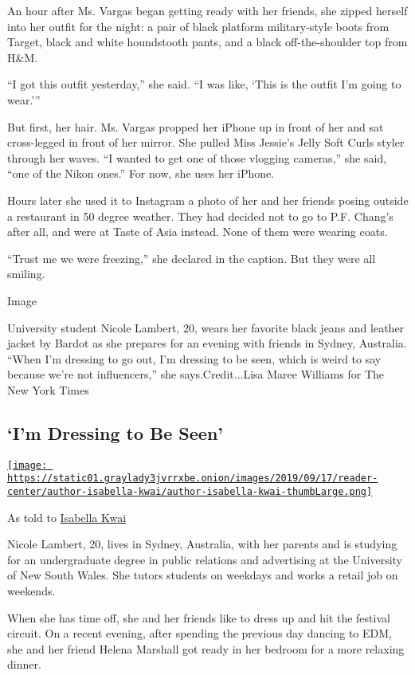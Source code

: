 An hour after Ms. Vargas began getting ready with her friends, she
zipped herself into her outfit for the night: a pair of black platform
military-style boots from Target, black and white houndstooth pants, and
a black off-the-shoulder top from H\&M.

``I got this outfit yesterday,'' she said. ``I was like, `This is the
outfit I'm going to wear.'''

But first, her hair. Ms. Vargas propped her iPhone up in front of her
and sat cross-legged in front of her mirror. She pulled Miss Jessie's
Jelly Soft Curls styler through her waves. ``I wanted to get one of
those vlogging cameras,'' she said, ``one of the Nikon ones.'' For now,
she uses her iPhone.

Hours later she used it to Instagram a photo of her and her friends
posing outside a restaurant in 50 degree weather. They had decided not
to go to P.F. Chang's after all, and were at Taste of Asia instead. None
of them were wearing coats.

``Trust me we were freezing,'' she declared in the caption. But they
were all smiling.

Image

University student Nicole Lambert, 20, wears her favorite black jeans
and leather jacket by Bardot as she prepares for an evening with friends
in Sydney, Australia. ``When I'm dressing to go out, I'm dressing to be
seen, which is weird to say because we're not influencers,'' she
says.Credit...Lisa Maree Williams for The New York Times

\hypertarget{im-dressing-to-be-seen}{%
\subsection{`I'm Dressing to Be Seen'}\label{im-dressing-to-be-seen}}

\href{https://www.nytimes3xbfgragh.onion/by/isabella-kwai}{\texttt{[image: https://static01.graylady3jvrrxbe.onion/images/2019/09/17/reader-center/author-isabella-kwai/author-isabella-kwai-thumbLarge.png]}}

As told to
\href{https://www.nytimes3xbfgragh.onion/by/isabella-kwai}{Isabella
Kwai}

Nicole Lambert, 20, lives in Sydney, Australia, with her parents and is
studying for an undergraduate degree in public relations and advertising
at the University of New South Wales. She tutors students on weekdays
and works a retail job on weekends.

When she has time off, she and her friends like to dress up and hit the
festival circuit. On a recent evening, after spending the previous day
dancing to EDM, she and her friend Helena Marshall got ready in her
bedroom for a more relaxing dinner.

